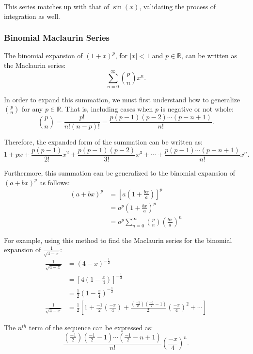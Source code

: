 \documentclass[12pt]{article}
\begin{document}
This series matches up with that of $\sin(x)$, validating the process of integration as well.

\subsubsection{Binomial Maclaurin Series}

\noindent The binomial expansion of $(1 + x)^p$, for $|x| < 1$ and $p \in \mathbb{R}$, can be written as the Maclaurin series:
\[ \sum_{n=0}^\infty \binom{p}{n} x^n. \]

In order to expand this summation, we must first understand how to generalize $\binom{p}{n}$ for any $p \in \mathbb{R}$. That is, including cases when $p$ is negative or not whole:
\[ \binom{p}{n} = \frac{p!}{n!(n-p)!} = \frac{p(p-1)(p-2) \cdots (p-n+1)}{n!}. \]

\noindent Therefore, the expanded form of the summation can be written as:
\[ 1 + px + \frac{p(p-1)}{2!} x^2 + \frac{p(p-1)(p-2)}{3!} x^3 + \cdots + \frac{p(p-1) \cdots (p-n+1)}{n!} x^n. \]

Furthermore, this summation can be generalized to the binomial expansion of ${(a + bx)^p}$ as follows:
\begin{align*}
    (a + bx)^p &= \left[ a \left( 1 + \frac{bx}{a} \right) \right]^p \\[6pt]
    &= a^p \left( 1 + \frac{bx}{a} \right)^p \\[6pt]
    &= a^p \sum_{n=0}^{\infty} \binom{p}{n} \left( \frac{bx}{a} \right)^n
\end{align*}

For example, using this method to find the Maclaurin series for the binomial expansion of $\frac{1}{\sqrt{4 - x}}$:
\begin{align*}
    \frac{1}{\sqrt{4 - x}} &= (4 - x)^{-\frac{1}{2}} \\[6pt]
    &= \left[ 4 \left( 1 - \frac{x}{4} \right) \right]^{-\frac{1}{2}} \\[6pt]
    &= \frac{1}{2} \left( 1 - \frac{x}{4} \right)^{-\frac{1}{2}} \\[6pt]
    \frac{1}{\sqrt{4 - x}} &= \frac{1}{2} \left[ 1 + \frac{-1}{2} \left( \frac{-x}{4} \right) + \frac{\left( \frac{-1}{2} \right) \left( \frac{-1}{2} - 1 \right)}{2!} \left( \frac{-x}{4} \right)^2 + \cdots \right]
\end{align*}

\noindent The $n^{th}$ term of the sequence can be expressed as:
\[ \frac{\left( \frac{-1}{2} \right) \left( \frac{-1}{2} - 1 \right) \cdots \left( \frac{-1}{2} - n + 1 \right)}{n!} \left( \frac{-x}{4} \right)^n. \]
\end{document}

